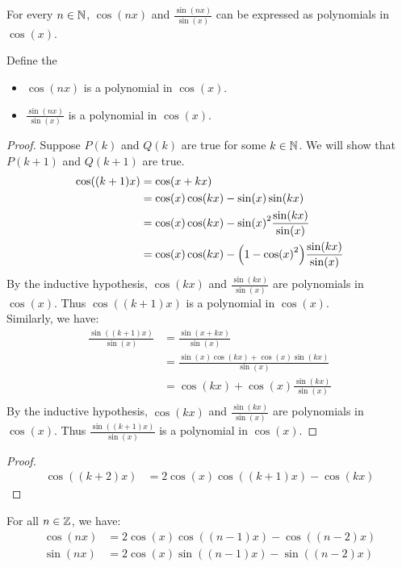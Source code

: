\documentclass{article}
\begin{document}
\begin{theorem}
    For every $n\in\N$, $\cos(nx)$ and $\frac{\sin(nx)}{\sin(x)}$ can be expressed as polynomials in $\cos(x)$.
\end{theorem}
Define the
\begin{itemize}
    \item[$P(n)$:] $\cos(nx)$ is a polynomial in $\cos(x)$.
    \item[$Q(n)$:] $\frac{\sin(nx)}{\sin(x)}$ is a polynomial in $\cos(x)$.
\end{itemize}
\begin{proof}
    Suppose $P(k)$ and $Q(k)$ are true for some $k\in\N$. We will show that $P(k+1)$ and $Q(k+1)$ are true.
    \begin{align*}
        \cos((k+1)x)
        &= \cos(x+kx) \\
        &= \cos(x)\cos(kx) - \sin(x)\sin(kx) \\
        &= \cos(x)\cos(kx) - \sin(x)^2\frac{\sin(kx)}{\sin(x)} \\
        &= \cos(x)\cos(kx) - \qty(1-\cos(x)^2)\frac{\sin(kx)}{\sin(x)}
    \end{align*}
    By the inductive hypothesis, $\cos(kx)$ and $\frac{\sin(kx)}{\sin(x)}$ are polynomials in $\cos(x)$. Thus $\cos((k+1)x)$ is a polynomial in $\cos(x)$.\\

    Similarly, we have:
    \begin{align*}
        \frac{\sin((k+1)x)}{\sin(x)}
        &= \frac{\sin(x+kx)}{\sin(x)} \\
        &= \frac{\sin(x)\cos(kx)+\cos(x)\sin(kx)}{\sin(x)} \\
        &= \cos(kx) + \cos(x)\frac{\sin(kx)}{\sin(x)} \\
    \end{align*}
    By the inductive hypothesis, $\cos(kx)$ and $\frac{\sin(kx)}{\sin(x)}$ are polynomials in $\cos(x)$. Thus $\frac{\sin((k+1)x)}{\sin(x)}$ is a polynomial in $\cos(x)$.
\end{proof}
\begin{proof}
    \begin{align}
        \cos((k+2)x)
        &= 2\cos(x)\cos((k+1)x) - \cos(kx)
    \end{align}
\end{proof}

\begin{theorem}
    For all $n\in\Z$, we have:
    \begin{align*}
        \cos(nx) &= 2\cos(x)\cos((n-1)x) - \cos((n-2)x) \\
        \sin(nx) &= 2\cos(x)\sin((n-1)x) - \sin((n-2)x)
    \end{align*}
\end{theorem}
\end{document}
